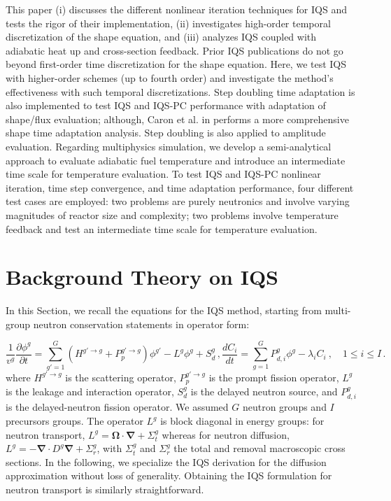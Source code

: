 \documentclass{elsarticle}
\renewcommand{\vec}[1]{\bm{#1}} %
\newcommand{\bs}[1]{\mathbf{#1}}
\renewcommand{\div}{\bs{\nabla}\! \cdot \!}
\newcommand{\grad}{\bs{\nabla}}
\newcommand{\iqspc}{IQS-PC\xspace}
\newcommand{\be}{\begin{equation}}
\newcommand{\ee}{\end{equation}}
\begin{document}
This paper (i) discusses the different nonlinear iteration techniques for IQS and tests the rigor of their implementation, (ii) investigates high-order temporal discretization of the shape equation, and (iii) analyzes IQS coupled with adiabatic heat up and cross-section feedback. Prior IQS publications do not go beyond first-order time discretization for the shape equation. Here, we test IQS with higher-order schemes (up to fourth order) and investigate the method's effectiveness with such temporal discretizations. Step doubling time adaptation is also implemented to test IQS and \iqspc performance with adaptation of shape/flux evaluation; although, Caron et al. in \cite{caron2017} performs a more comprehensive shape time adaptation analysis. Step doubling is also applied to amplitude evaluation. Regarding multiphysics simulation, we develop a semi-analytical approach to evaluate adiabatic fuel temperature and introduce an intermediate time scale for temperature evaluation. To test IQS and \iqspc nonlinear iteration, time step convergence, and time adaptation performance, four different test cases are employed: two problems are purely neutronics and involve varying magnitudes of reactor size and complexity; two problems involve temperature feedback and test an intermediate time scale for temperature evaluation.

\section{Background Theory on IQS}

In this Section, we recall the equations for the IQS method, starting from multi-group neutron conservation statements in operator form:

\begin{subequations}
\be
\frac{1}{v^g}\frac{\partial \phi^g}{\partial t} = \sum_{g'=1}^G \left(H^{g'\to g} + P_p^{g' \to g} \right) \phi^{g'} - L^g\phi^g + S_{d}^g \,,
\label{eq:flux}
\ee 
\be
\frac{dC_i}{dt} = \sum_{g=1}^G P_{d,i}^g \phi^{g} - \lambda_i C_i \ , \quad 1 \le i \le I  \,.
\label{eq:precursor}
\ee
\end{subequations}
%
where $H^{g'\to g}$ is the scattering operator, $P_p^{g' \to g}$ is the prompt fission operator, $L^g$ is the leakage and interaction operator, 
$S_{d}^g$ is the delayed neutron source, and $P_{d,i}^g$ is the delayed-neutron fission operator. We assumed $G$ neutron groups and $I$ precursors groups.
The operator $L^g$ is block diagonal in energy groups: for neutron transport, $L^g = \vec \Omega \cdot \grad + \Sigma_t^g$ whereas for neutron diffusion, 
$L^g = -\div D^g \grad + \Sigma_r^g$, with  $\Sigma_t^g$ and $\Sigma_r^g$ the total and removal macroscopic cross sections. In the following, we specialize the 
IQS derivation for the diffusion approximation without loss of generality. Obtaining the IQS formulation for neutron transport is similarly straightforward.
\end{document}
